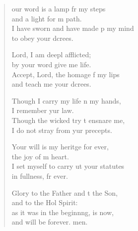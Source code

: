 \begin{verse}
  \begin{patverse}
our word is a lamp fr my steps\Med\\
and a light for m path.\\
I have sworn and have made p my mind\Med\\
to obey your dcrees.

Lord, I am deepl afflicted;\Med\\
by your word give me life.\\
Accept, Lord, the homage f my lips\Med\\
and teach me your dcrees.

Though I carry my life n my hands,\Med\\
I remember yur law.\\
Though the wicked try t ensnare me,\Med\\
I do not stray from yur precepts.

Your will is my heritge for ever,\Med\\
the joy of m heart.\\
I set myself to carry ut your statutes\Med\\
in fullness, fr ever.

Glory to the Father and t the Son,\Med\\
and to the Hol Spirit:\\
as it was in the beginnng, is now,\Med\\
and will be forever. men. 
  \end{patverse}
\end{verse}
